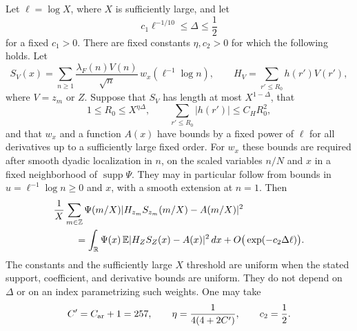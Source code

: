 \begin{proposition}
\label{analytic:comparison}
Let $\ell=\log X$, where $X$ is sufficiently large, and let
\[
 c_1\ell^{-1/10}\leq\Delta\leq\frac12
\]
for a fixed $c_1>0$. There are fixed constants $\eta,c_2>0$ for which
the following holds. Let
\[
 S_V(x)=\sum_{n\geq1}\frac{\lambda_F(n)V(n)}{\sqrt n}\,
                         w_x(\ell^{-1}\log n),\qquad
 H_V=\sum_{r'\leq R_0}h(r')V(r'),
\]
where $V=z_m$ or $Z$. Suppose that $S_V$ has length at most
$X^{1-\Delta}$, that
\begin{equation}\label{analytic:multiplier-conditions}
 1\leq R_0\leq X^{\eta\Delta},\qquad
 \sum_{r'\leq R_0}|h(r')|\leq C_H R_0^2,
\end{equation}
and that $w_x$ and a function $A(x)$ have bounds by a fixed power of
$\ell$ for all derivatives up to a sufficiently large fixed order.
For $w_x$ these bounds are required after smooth dyadic localization
in $n$, on the scaled variables $n/N$ and $x$ in a fixed neighborhood
of $\operatorname{supp}\Psi$. They may in particular follow from
bounds in $u=\ell^{-1}\log n\geq0$ and $x$, with a smooth extension
at $n=1$. Then
\begin{align}
 &\frac1X\sum_{m\in\mathbb Z}\Psi(m/X)
       |H_{z_m}S_{z_m}(m/X)-A(m/X)|^2
 \nonumber\\
 &\hspace{8mm}=
 \int_{\mathbb R}\Psi(x)\,
       \mathbb E|H_ZS_Z(x)-A(x)|^2\,dx
       +O\big(\exp(-c_2\Delta\ell)\big).
 \label{analytic:model-comparison}
\end{align}
The constants and the sufficiently large $X$ threshold are uniform
when the stated support, coefficient, and derivative bounds are
uniform. They do not depend on $\Delta$ or on an index parametrizing
such weights. One may take
\begin{equation}\label{analytic:comparison-constants}
 C'=C_{\rm ar}+1=257,\qquad
 \eta=\frac1{4(4+2C')},\qquad c_2=\frac12.
\end{equation}
\end{proposition}

